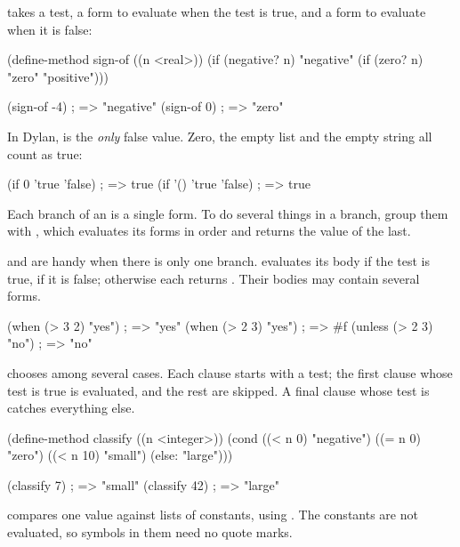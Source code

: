  takes a test, a form to evaluate when the test is true, and a
form to evaluate when it is false:

\begin{dylan}
(define-method sign-of ((n <real>))
  (if (negative? n)
      "negative"
      (if (zero? n) "zero" "positive")))

(sign-of -4)                    ; => "negative"
(sign-of 0)                     ; => "zero"
\end{dylan}

\begin{warnbox}
In Dylan,  is the \emph{only} false value. Zero, the empty
list and the empty string all count as true:
\begin{dylan}
(if 0 'true 'false)             ; => true
(if '() 'true 'false)           ; => true
\end{dylan}
\end{warnbox}

Each branch of an  is a single form. To do several things in a
branch, group them with , which evaluates its forms in order
and returns the value of the last.

 and  are handy when there is only one branch.
 evaluates its body if the test is true,  if it is
false; otherwise each returns . Their bodies may contain several
forms.

\begin{dylan}
(when (> 3 2) "yes")            ; => "yes"
(when (> 2 3) "yes")            ; => #f
(unless (> 2 3) "no")           ; => "no"
\end{dylan}

 chooses among several cases. Each clause starts with a test;
the first clause whose test is true is evaluated, and the rest are skipped.
A final clause whose test is  catches everything else.

\begin{dylan}
(define-method classify ((n <integer>))
  (cond ((< n 0)  "negative")
        ((= n 0)  "zero")
        ((< n 10) "small")
        (else:    "large")))

(classify 7)                    ; => "small"
(classify 42)                   ; => "large"
\end{dylan}

 compares one value against lists of constants, using
. The constants are not evaluated, so symbols in them need no
quote marks.

